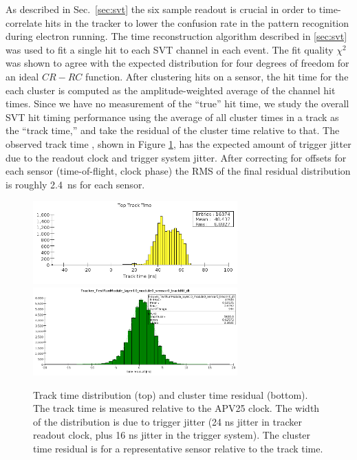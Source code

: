 As described in Sec.~\ref{sec:svt} the six sample readout is crucial in order to time-correlate 
hits in the tracker to lower the confusion rate in the pattern recognition during electron running. 
The time reconstruction algorithm described in \ref{sec:svt} was used to fit a single hit to each SVT channel in each event. The fit quality $\chi^2$ was shown to agree with the expected distribution 
for four degrees of freedom for an ideal $CR-RC$ function. 
After clustering hits on a sensor, the hit time for the each cluster is computed as the 
amplitude-weighted average of the channel hit times. Since we have no measurement of the ``true'' hit time, we study the overall SVT hit 
timing performance using the average of all cluster times in a track as the ``track time,'' and take the
 residual of the cluster time relative to that. The observed track time , shown in Figure \ref{fig:tracktime}, has the expected amount of trigger jitter due to the readout clock and trigger 
 system jitter. After correcting for offsets for each sensor (time-of-flight, clock phase) the RMS 
 of the final residual distribution is roughly 2.4~ns for each sensor. 
\begin{figure}[ht]
	\includegraphics[width=0.7\textwidth]{test2012/svtperformance/track_time_top}
	\includegraphics[width=0.7\textwidth]{test2012/svtperformance/timeres}
	\caption{\small{Track time distribution (top) and cluster time residual (bottom). The 
	track time is measured relative to the APV25 clock. The width of the distribution is due to 
	trigger jitter (24 ns jitter in tracker readout clock, plus 16 ns jitter in the trigger system). 
	The cluster time residual is for a representative sensor relative to the track time.}}
	\label{fig:tracktime}
\end{figure}
